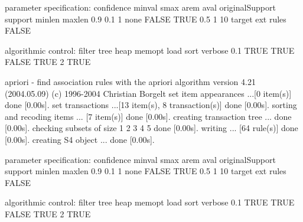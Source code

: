\documentclass{article}
\begin{document}
\begin{Schunk}
\begin{Soutput}
parameter specification:
 confidence minval smax arem  aval originalSupport support minlen maxlen
        0.9    0.1    1 none FALSE            TRUE     0.5      1     10
 target   ext
  rules FALSE

algorithmic control:
 filter tree heap memopt load sort verbose
    0.1 TRUE TRUE  FALSE TRUE    2    TRUE

apriori - find association rules with the apriori algorithm
version 4.21 (2004.05.09)        (c) 1996-2004   Christian Borgelt
set item appearances ...[0 item(s)] done [0.00s].
set transactions ...[13 item(s), 8 transaction(s)] done [0.00s].
sorting and recoding items ... [7 item(s)] done [0.00s].
creating transaction tree ... done [0.00s].
checking subsets of size 1 2 3 4 5 done [0.00s].
writing ... [64 rule(s)] done [0.00s].
creating S4 object  ... done [0.00s].

parameter specification:
 confidence minval smax arem  aval originalSupport support minlen maxlen
        0.9    0.1    1 none FALSE            TRUE     0.5      1     10
 target   ext
  rules FALSE

algorithmic control:
 filter tree heap memopt load sort verbose
    0.1 TRUE TRUE  FALSE TRUE    2    TRUE


\end{Soutput}
\end{Schunk}
\end{document}
